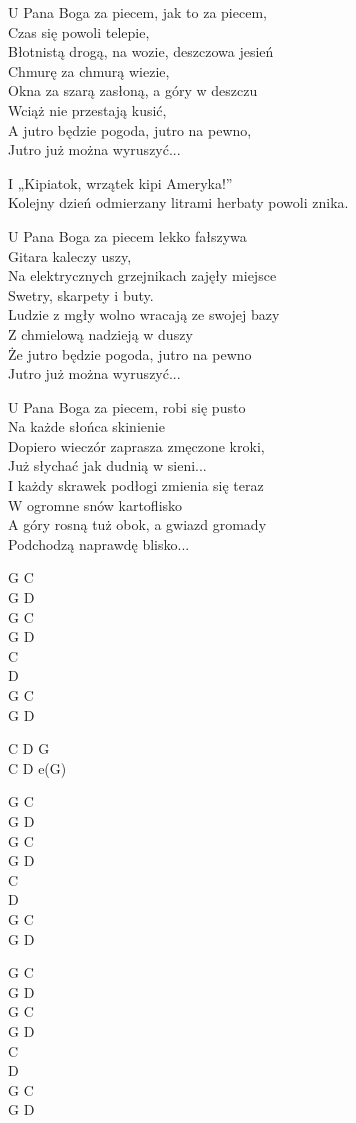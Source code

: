 \begin{text}
    \small{
    U Pana Boga za piecem, jak to za piecem,\\
    Czas się powoli telepie,\\
    Błotnistą drogą, na wozie, deszczowa jesień\\
    Chmurę za chmurą wiezie,\\
    Okna za szarą zasłoną, a góry w deszczu\\
    Wciąż nie przestają kusić,\\
    A jutro będzie pogoda, jutro na pewno,\\
    Jutro już można wyruszyć...

    I „Kipiatok, wrzątek kipi Ameryka!”\\
    Kolejny dzień odmierzany litrami herbaty powoli znika.

    U Pana Boga za piecem lekko fałszywa\\
    Gitara kaleczy uszy,\\
    Na elektrycznych grzejnikach zajęły miejsce\\
    Swetry, skarpety i buty.\\
    Ludzie z mgły wolno wracają ze swojej bazy\\
    Z chmielową nadzieją w duszy\\
    Że jutro będzie pogoda, jutro na pewno\\
    Jutro już można wyruszyć...

    U Pana Boga za piecem, robi się pusto\\
    Na każde słońca skinienie\\
    Dopiero wieczór zaprasza zmęczone kroki,\\
    Już słychać jak dudnią w sieni...\\
    I każdy skrawek podłogi zmienia się teraz\\
    W ogromne snów kartoflisko\\
    A góry rosną tuż obok, a gwiazd gromady\\
    Podchodzą naprawdę blisko...
    }
\end{text}
\begin{chord}
    \small{
    G C\\
    G D\\
    G C\\
    G D\\
    C\\
    D\\
    G C\\
    G D

    C D G\\
    C D e(G)

    G C\\
    G D\\
    G C\\
    G D\\
    C\\
    D\\
    G C\\
    G D

    G C\\
    G D\\
    G C\\
    G D\\
    C\\
    D\\
    G C\\
    G D
    }
\end{chord}
